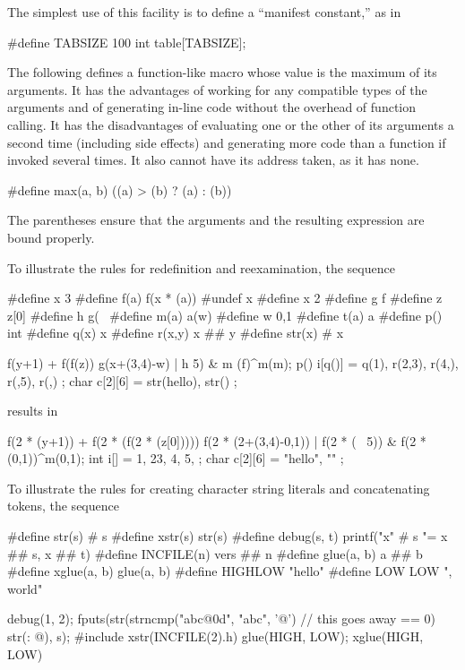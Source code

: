 \pnum
\enterexample
The simplest use of this facility is to define a ``manifest constant,''
as in
\begin{codeblock}
#define TABSIZE 100
int table[TABSIZE];
\end{codeblock}
\exitexample

\pnum
\enterexample
The following defines a function-like
macro whose value is the maximum of its arguments.
It has the advantages of working for any compatible types of the arguments
and of generating in-line code without the overhead of function calling.
It has the disadvantages of evaluating one or the other of its arguments
a second time
(including
%
side effects)
and generating more code than a function if invoked several times.
It also cannot have its address taken,
as it has none.

\begin{codeblock}
#define max(a, b) ((a) > (b) ? (a) : (b))
\end{codeblock}

The parentheses ensure that the arguments and
the resulting expression are bound properly.
\exitexample

\pnum
\enterexample
To illustrate the rules for redefinition and reexamination,
the sequence

\begin{codeblock}
#define x       3
#define f(a)    f(x * (a))
#undef  x
#define x       2
#define g       f
#define z       z[0]
#define h       g(~
#define m(a)    a(w)
#define w       0,1
#define t(a)    a
#define p()     int
#define q(x)    x
#define r(x,y)  x ## y
#define str(x)  # x

f(y+1) + f(f(z)) %
g(x+(3,4)-w) | h 5) & m
    (f)^m(m);
p() i[q()] = { q(1), r(2,3), r(4,), r(,5), r(,) };
char c[2][6] = { str(hello), str() };
\end{codeblock}

results in

\begin{codeblock}
f(2 * (y+1)) + f(2 * (f(2 * (z[0])))) %
f(2 * (2+(3,4)-0,1)) | f(2 * (~ 5)) & f(2 * (0,1))^m(0,1);
int i[] = { 1, 23, 4, 5, };
char c[2][6] = { "hello", "" };
\end{codeblock}
\exitexample

\pnum
\enterexample
To illustrate the rules for creating character string literals
and concatenating tokens,
the sequence

\begin{codeblock}
#define str(s)      # s
#define xstr(s)     str(s)
#define debug(s, t) printf("x" # s "= %
               x ## s, x ## t)
#define INCFILE(n)  vers ## n
#define glue(a, b)  a ## b
#define xglue(a, b) glue(a, b)
#define HIGHLOW     "hello"
#define LOW         LOW ", world"

debug(1, 2);
fputs(str(strncmp("abc@\textbackslash@0d", "abc", '@')  // this goes away
    == 0) str(: @\atsign\textbackslash@n), s);
#include xstr(INCFILE(2).h)
glue(HIGH, LOW);
xglue(HIGH, LOW)
\end{codeblock}

